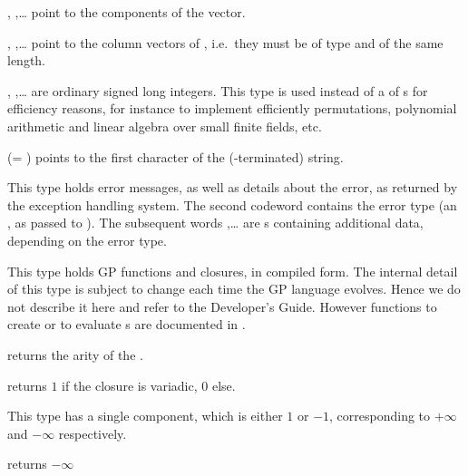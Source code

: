 %
, ,\dots {} point to the components of the
vector.

 ,
,\dots {} point to the column vectors of ,
i.e.~they must be of type  and of the same length.

, ,\dots {} are ordinary signed long
integers. This type is used instead of a  of s for
efficiency reasons, for instance to implement efficiently permutations,
polynomial arithmetic and linear algebra over small finite fields, etc.

%

 (= ) points to the first character of the
(-terminated) string.

This type holds error messages, as well as details about the error, as
returned by the exception handling system. The second codeword 
contains the error type (an , as passed to ). The
subsequent words ,\dots {} are s containing
additional data, depending on the error type.

This type holds GP functions and closures, in compiled form. The internal detail
of this type is subject to change each time the GP language evolves. Hence we
do not describe it here and refer to the Developer's Guide.  However
functions to create or to evaluate s are documented in
.

 returns the arity of the .

 returns $1$ if the closure  is
variadic, $0$ else.


This type has a single  component, which is either $1$ or $-1$,
corresponding to $+\infty$ and $-\infty$ respectively.

 returns $-\infty$

